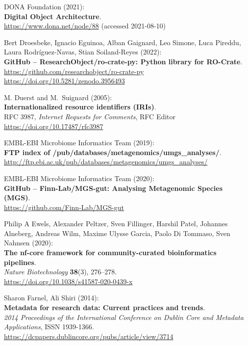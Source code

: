 \begin{thebibliography}{9}
DONA Foundation (2021):\\
\textbf{Digital Object Architecture}.\\
\url{https://www.dona.net/node/88} (accessed 2021-08-10)


Bert Droesbeke, Ignacio Eguinoa, Alban Gaignard, Leo Simone,
Luca Pireddu, Laura Rodríguez-Navas, Stian Soiland-Reyes (2022):\\
\textbf{GitHub -- ResearchObject/ro-crate-py: Python library for
RO-Crate}.\\
\url{https://github.com/researchobject/ro-crate-py}\\
\url{https://doi.org/10.5281/zenodo.3956493}

M. Duerst and M.~Suignard (2005):\\
\textbf{Internationalized resource identifiers (IRIs)}.\\
RFC 3987, \emph{Internet Requests for Comments}, RFC Editor\\
\url{https://doi.org/10.17487/rfc3987}

EMBL-EBI Microbiome Informatics Team (2019):\\
\textbf{FTP index of /pub/databases/metagenomics/umgs\_analyses/}.\\
\url{http://ftp.ebi.ac.uk/pub/databases/metagenomics/umgs_analyses/}

EMBL-EBI Microbiome Informatics Team (2020):\\
\textbf{GitHub -- Finn-Lab/MGS-gut: Analysing Metagenomic Species
(MGS)}.\\
\url{https://github.com/Finn-Lab/MGS-gut}

Philip A Ewels, Alexander Peltzer, Sven Fillinger, Harshil
Patel, Johannes Alneberg, Andreas Wilm, Maxime Ulysse Garcia, Paolo Di
Tommaso, Sven Nahnsen (2020):\\
\textbf{The nf-core framework for community-curated bioinformatics
pipelines}.\\
\emph{Nature Biotechnology} \textbf{38}(3), 276--278.\\
\url{https://doi.org/10.1038/s41587-020-0439-x}

Sharon Farnel, Ali Shiri (2014):\\
\textbf{Metadata for research data: Current practices and trends}.\\
\emph{2014 Proceedings of the International Conference on Dublin Core
and Metadata Applications}, ISSN 1939-1366.\\
\url{https://dcpapers.dublincore.org/pubs/article/view/3714}


\end{thebibliography}
